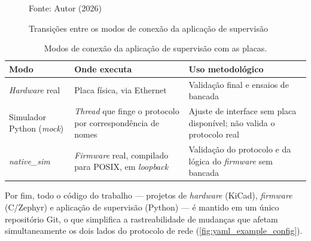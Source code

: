 \begin{figure}[H]
    \centering
    \caption{Transições entre os modos de conexão da aplicação de supervisão}
    \label{fig:modos_conexao}

    Fonte: Autor (2026)
\end{figure}

\begin{table}[h]
\centering
\caption{Modos de conexão da aplicação de supervisão com as placas.}
\label{tab:modos_conexao}
\begin{tabular}{p{2.2cm}p{4.4cm}p{5.6cm}}
\hline
\textbf{Modo} & \textbf{Onde executa} & \textbf{Uso metodológico} \\
\hline
\textit{Hardware} real & Placa física, via Ethernet & Validação final e ensaios de bancada \\
Simulador Python (\textit{mock}) & \textit{Thread} que finge o protocolo por correspondência de nomes & Ajuste de interface sem placa disponível; não valida o protocolo real \\
\textit{native\_sim} & \textit{Firmware} real, compilado para POSIX, em \textit{loopback} & Validação do protocolo e da lógica do \textit{firmware} sem bancada \\
\hline
\end{tabular}
\end{table}

Por fim, todo o código do trabalho --- projetos de \textit{hardware} (KiCad),
\textit{firmware} (C/Zephyr) e aplicação de supervisão (Python) --- é mantido
em um único repositório Git, o que simplifica a rastreabilidade de mudanças
que afetam simultaneamente os dois lados do protocolo de rede
(\autoref{fig:yaml_example_config}).
